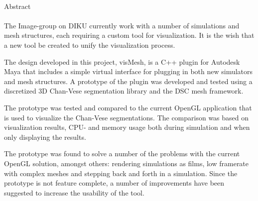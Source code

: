 \hspace{1cm}\\[5cm]
{\huge Abstract}
\\\HRule\\

The Image-group on DIKU currently work with a number of simulations and mesh
structures, each requiring a custom tool for visualization. It is the wish that
a new tool be created to unify the visualization process.

The design developed in this project, visMesh, is a C++ plugin for Autodesk Maya
that includes a simple virtual interface for plugging in both new simulators and
mesh structures. A prototype of the plugin was developed and tested using a
discretized 3D Chan-Vese segmentation library and the DSC mesh framework.

The prototype was tested and compared to the current OpenGL application that is
used to visualize the Chan-Vese segmentations. The comparison was based on
visualization results, CPU- and memory usage both during simulation and when
only displaying the results.

The prototype was found to solve a number of the problems with the current
OpenGL solution, amongst others: rendering simulations as films, low framerate
with complex meshes and stepping back and forth in a simulation. Since the
prototype is not feature complete, a number of improvements have been suggested
to increase the usability of the tool.\\
\HRule